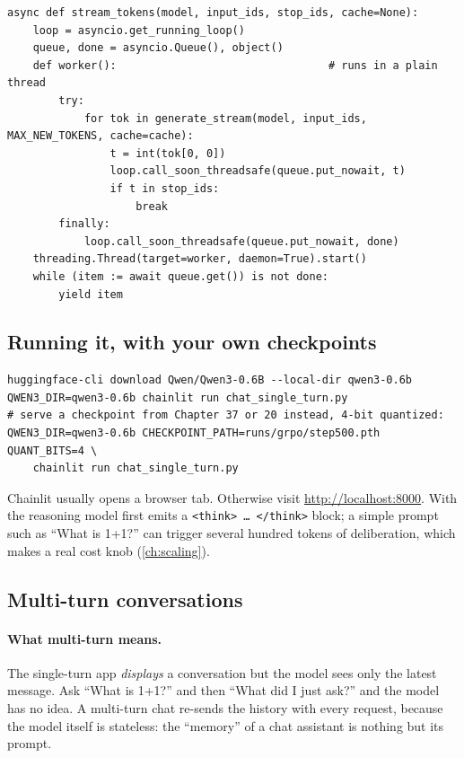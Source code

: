 \begin{lstlisting}[caption={Bridging blocking generation and an async web framework.},
label={lst:efficient:stream}]
async def stream_tokens(model, input_ids, stop_ids, cache=None):
    loop = asyncio.get_running_loop()
    queue, done = asyncio.Queue(), object()
    def worker():                                 # runs in a plain thread
        try:
            for tok in generate_stream(model, input_ids, MAX_NEW_TOKENS, cache=cache):
                t = int(tok[0, 0])
                loop.call_soon_threadsafe(queue.put_nowait, t)
                if t in stop_ids:
                    break
        finally:
            loop.call_soon_threadsafe(queue.put_nowait, done)
    threading.Thread(target=worker, daemon=True).start()
    while (item := await queue.get()) is not done:
        yield item
\end{lstlisting}

\subsection{Running it, with your own checkpoints}
\begin{lstlisting}[style=shell]
huggingface-cli download Qwen/Qwen3-0.6B --local-dir qwen3-0.6b
QWEN3_DIR=qwen3-0.6b chainlit run chat_single_turn.py
# serve a checkpoint from Chapter 37 or 20 instead, 4-bit quantized:
QWEN3_DIR=qwen3-0.6b CHECKPOINT_PATH=runs/grpo/step500.pth QUANT_BITS=4 \
    chainlit run chat_single_turn.py
\end{lstlisting}
Chainlit usually opens a browser tab. Otherwise visit \url{http://localhost:8000}. With
\code{THINKING=1} the reasoning model first emits a \texttt{<think>\,\dots\,</think>}
block; a simple prompt such as ``What is 1+1?'' can trigger several hundred tokens of
deliberation, which makes \code{MAX\_NEW\_TOKENS} a real cost knob
(\cref{ch:scaling}).

\subsection{Multi-turn conversations}
\paragraph{What multi-turn means.} The single-turn app \emph{displays} a conversation but
the model sees only the latest message. Ask ``What is 1+1?'' and then ``What did I just
ask?'' and the model has no idea. A multi-turn chat re-sends the history with every
request, because the model itself is stateless: the ``memory'' of a chat assistant is
nothing but its prompt.

